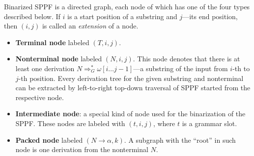 Binarized SPPF is a directed graph, each node of which has one of the four types described below. 
If $i$ is a start position of a substring and $j$---its end position, then $(i,j)$ is called an \emph{extension} of a node.


\begin{itemize}
    \item \textbf{Terminal node} labeled $(T, i, j)$.
    \item \textbf{Nonterminal node} labeled $(N, i, j)$. 
    This node denotes that there is at least one derivation $N \Rightarrow^*_G \omega[i \dots j-1]$---a substring of the input from $i$-th to $j$-th position.
    Every derivation tree for the given substring and nonterminal can be extracted by left-to-right top-down traversal of SPPF started from the respective node.     
    \item \textbf{Intermediate node}: a special kind of node used for the binarization of the SPPF. These nodes are labeled with $(t,i,j)$, where $t$ is a grammar slot.
    \item \textbf{Packed node} labeled $(N \rightarrow \alpha, k)$. 
    A subgraph with the ``root'' in such node is one derivation from the nonterminal $N$.

\end{itemize}

%
%

